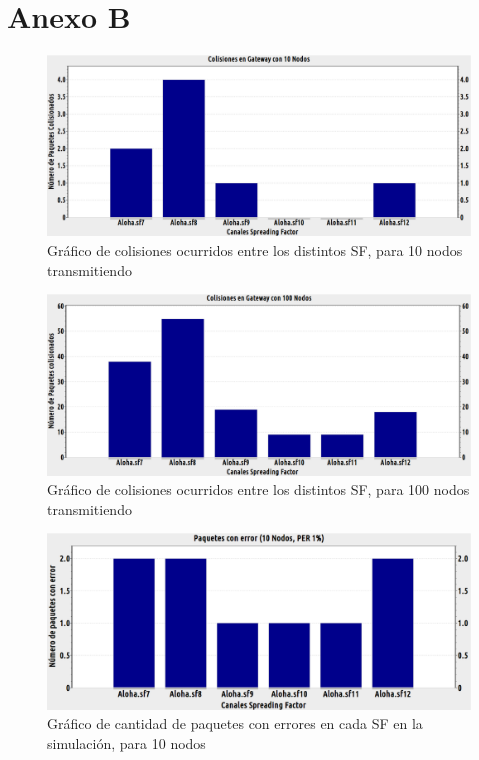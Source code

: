 \chapter{Anexo B}

\begin{figure}[!ht]
\centering
\includegraphics[angle=270, scale=0.4]{images/colisiones10nodos.eps}
\caption{Gráfico de colisiones ocurridos entre los distintos SF, para 10 nodos transmitiendo}
\label{anexb:1}
\end{figure}


\begin{figure}[!ht]
\centering
\includegraphics[angle=270, scale=0.4]{images/colisiones100nodos.eps}
\caption{Gráfico de colisiones ocurridos entre los distintos SF, para 100 nodos transmitiendo}
\label{anexb:2}
\end{figure}

\begin{figure}[!ht]
\centering
\includegraphics[angle=270, scale=0.4]{images/errores10nodos.eps}
\caption{Gráfico de cantidad de paquetes con errores en cada SF en la simulación, para 10 nodos}
\label{anexb:3}
\end{figure}

